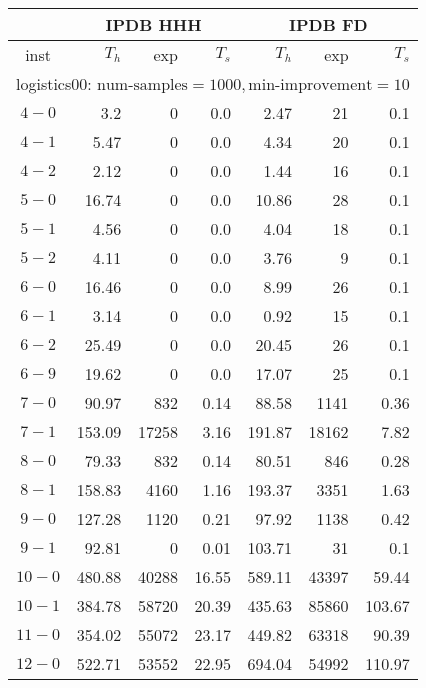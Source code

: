 \begin{longtable}{|c||r|r|r||r|r|r|}\firsthline
& \multicolumn{3}{c||}{IPDB HHH} & \multicolumn{3}{c||}{IPDB FD}\\\hline
inst & $T_h$ & exp & $T_s$ & $T_h$ & exp & $T_s$\\\hline
\multicolumn{7}{|l|}{logistics00: $\text{num-samples}=1000,\text{min-improvement}=10$}\\\hline
$4-0$ & 3.2 & 0 & 0.0 & 2.47 & 21 & 0.1 \\\hline
$4-1$ & 5.47 & 0 & 0.0 & 4.34 & 20 & 0.1 \\\hline
$4-2$ & 2.12 & 0 & 0.0 & 1.44 & 16 & 0.1 \\\hline
$5-0$ & 16.74 & 0 & 0.0 & 10.86 & 28 & 0.1 \\\hline
$5-1$ & 4.56 & 0 & 0.0 & 4.04 & 18 & 0.1 \\\hline
$5-2$ & 4.11 & 0 & 0.0 & 3.76 & 9 & 0.1 \\\hline
$6-0$ & 16.46 & 0 & 0.0 & 8.99 & 26 & 0.1 \\\hline
$6-1$ & 3.14 & 0 & 0.0 & 0.92 & 15 & 0.1 \\\hline
$6-2$ & 25.49 & 0 & 0.0 & 20.45 & 26 & 0.1 \\\hline
$6-9$ & 19.62 & 0 & 0.0 & 17.07 & 25 & 0.1 \\\hline
$7-0$ & 90.97 & 832 & 0.14 & 88.58 & 1141 & 0.36 \\\hline
$7-1$ & 153.09 & 17258 & 3.16 & 191.87 & 18162 & 7.82 \\\hline
$8-0$ & 79.33 & 832 & 0.14 & 80.51 & 846 & 0.28 \\\hline
$8-1$ & 158.83 & 4160 & 1.16 & 193.37 & 3351 & 1.63 \\\hline
$9-0$ & 127.28 & 1120 & 0.21 & 97.92 & 1138 & 0.42 \\\hline
$9-1$ & 92.81 & 0 & 0.01 & 103.71 & 31 & 0.1 \\\hline
$10-0$ & 480.88 & 40288 & 16.55 & 589.11 & 43397 & 59.44 \\\hline
$10-1$ & 384.78 & 58720 & 20.39 & 435.63 & 85860 & 103.67 \\\hline
$11-0$ & 354.02 & 55072 & 23.17 & 449.82 & 63318 & 90.39 \\\hline
$12-0$ & 522.71 & 53552 & 22.95 & 694.04 & 54992 & 110.97 \\\hline


\end{longtable}
